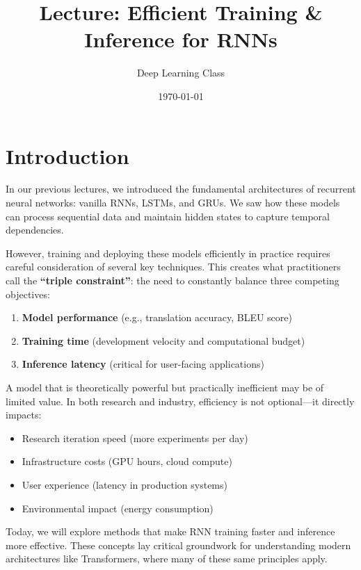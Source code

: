 \documentclass{article}
\title{Lecture: Efficient Training \& Inference for RNNs}
\author{Deep Learning Class}
\date{\today}
\begin{document}
\maketitle

\section{Introduction}

In our previous lectures, we introduced the fundamental architectures of recurrent neural networks: vanilla RNNs, LSTMs, and GRUs. We saw how these models can process sequential data and maintain hidden states to capture temporal dependencies.

However, training and deploying these models efficiently in practice requires careful consideration of several key techniques. This creates what practitioners call the \textbf{``triple constraint''}: the need to constantly balance three competing objectives:

\begin{enumerate}
\item \textbf{Model performance} (e.g., translation accuracy, BLEU score)
\item \textbf{Training time} (development velocity and computational budget)
\item \textbf{Inference latency} (critical for user-facing applications)
\end{enumerate}

\begin{tcolorbox}[colback=yellow!5!white, colframe=orange!50!black, title=The Efficiency Imperative]
A model that is theoretically powerful but practically inefficient may be of limited value. In both research and industry, efficiency is not optional—it directly impacts:
\begin{itemize}
\item Research iteration speed (more experiments per day)
\item Infrastructure costs (GPU hours, cloud compute)
\item User experience (latency in production systems)
\item Environmental impact (energy consumption)
\end{itemize}
\end{tcolorbox}

Today, we will explore methods that make RNN training faster and inference more effective. These concepts lay critical groundwork for understanding modern architectures like Transformers, where many of these same principles apply.
\end{document}
